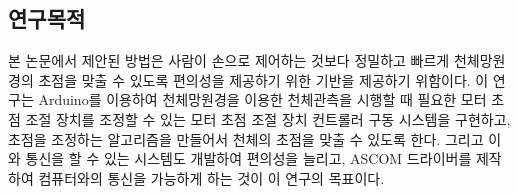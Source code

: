
\subsection{연구목적}

본 논문에서 제안된 방법은 사람이 손으로 제어하는 것보다 정밀하고 빠르게 천체망원경의 초점을 맞출 수 있도록 편의성을 제공하기 위한 기반을 제공하기 위함이다. 이 연구는 Arduino를 이용하여 천체망원경을 이용한 천체관측을 시행할 때 필요한 모터 초점 조절 장치를 조정할 수 있는 모터 초점 조절 장치 컨트롤러 구동 시스템을 구현하고, 초점을 조정하는 알고리즘을 만들어서 천체의 초점을 맞출 수 있도록 한다. 그리고 이와 통신을 할 수 있는 시스템도 개발하여 편의성을 늘리고, ASCOM 드라이버를 제작하여 컴퓨터와의 통신을 가능하게 하는 것이 이 연구의 목표이다.